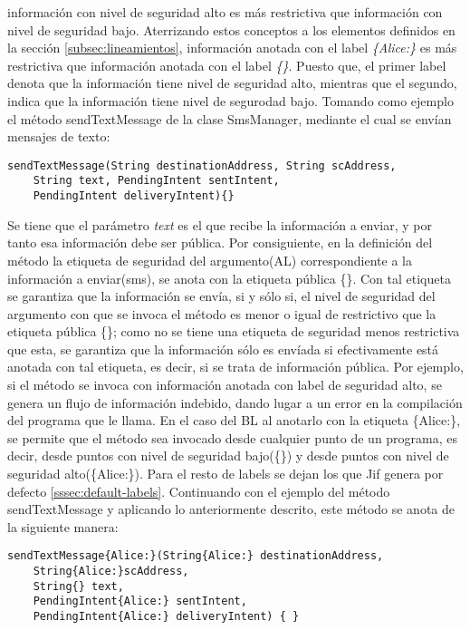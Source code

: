 información con nivel de seguridad alto es más restrictiva que información con nivel de
seguridad bajo.
Aterrizando estos conceptos a los elementos definidos en la sección
\ref{subsec:lineamientos}, información anotada con el label \emph{\{Alice:\}} es
más restrictiva que información anotada con el label \emph{\{\}}. Puesto que, el
primer label denota que la información tiene nivel de seguridad alto, mientras
que el segundo, indica que la información tiene nivel de segurodad bajo.\newline 
Tomando como ejemplo el método sendTextMessage de la clase SmsManager, mediante
el cual se envían mensajes de texto:
\begin{lstlisting}[basicstyle=\scriptsize]
sendTextMessage(String destinationAddress, String scAddress, 
	String text, PendingIntent sentIntent, 
	PendingIntent deliveryIntent){}
\end{lstlisting}

Se tiene que el parámetro \emph{text} es el que recibe la información a enviar,
y por tanto esa información debe ser pública.\newline 
Por consiguiente, en la definición del método la etiqueta de seguridad del
argumento(AL) correspondiente a la información a enviar(sms), se anota con la
etiqueta pública \{\}.
Con tal etiqueta se garantiza que la información se envía, si y sólo si, el
nivel de seguridad del argumento con que se invoca el método es menor o igual de
restrictivo que la etiqueta pública \{\}; como no se tiene una etiqueta de
seguridad menos restrictiva que esta, se garantiza que la información sólo es
envíada si efectivamente está anotada con tal etiqueta, es decir, si se trata
de información pública.\newline 
Por ejemplo,
si el método se invoca con información anotada con label de seguridad alto, se
genera un flujo de información indebido, dando lugar a un error en la
compilación del programa que le llama.\newline 
En el caso del BL al anotarlo con la etiqueta \{Alice:\}, se permite que el
método sea invocado desde cualquier punto de un programa, es decir, desde
puntos con nivel de seguridad bajo(\{\}) y desde puntos con nivel de seguridad
alto(\{Alice:\}).
Para el resto de labels se dejan los que Jif genera por defecto
\ref{sssec:default-labels}.\newline
Continuando con el ejemplo del método sendTextMessage y aplicando lo
anteriormente descrito, este método se anota de la siguiente manera:
\begin{lstlisting}[basicstyle=\scriptsize]
sendTextMessage{Alice:}(String{Alice:} destinationAddress, 
	String{Alice:}scAddress, 
	String{} text, 
	PendingIntent{Alice:} sentIntent,
	PendingIntent{Alice:} deliveryIntent) { }
\end{lstlisting}

